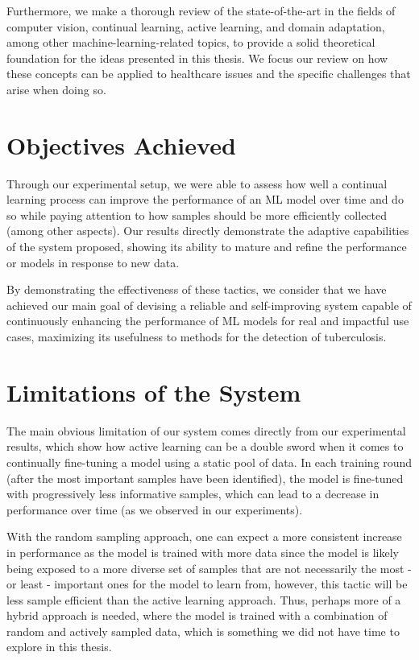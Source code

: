 \documentclass[../main.tex]{subfiles}
\begin{document}
    Furthermore, we make a thorough review of the state-of-the-art in the fields of computer vision, continual learning, active learning, and domain adaptation, among other machine-learning-related topics, to provide a solid theoretical foundation for the ideas presented in this thesis. We focus our review on how these concepts can be applied to healthcare issues and the specific challenges that arise when doing so.


    \section{Objectives Achieved
        } \label{conclusions:objectives_achieved} 

    Through our experimental setup, we were able to assess how well a continual learning process can improve the performance of an ML model over time and do so while paying attention to how samples should be more efficiently collected (among other aspects). Our results directly demonstrate the adaptive capabilities of the system proposed, showing its ability to mature and refine the performance or models in response to new data.

     By demonstrating the effectiveness of these tactics, we consider that we have achieved our main goal of devising a reliable and self-improving system capable of continuously enhancing the performance of ML models for real and impactful use cases, maximizing its usefulness to methods for the detection of tuberculosis.
     


    \section{Limitations of the System} \label{conclusions:limitations} 

    The main obvious limitation of our system comes directly from our experimental results, which show how active learning can be a double sword when it comes to continually fine-tuning a model using a static pool of data. In each training round (after the most important samples have been identified), the model is fine-tuned with progressively less informative samples, which can lead to a decrease in performance over time (as we observed in our experiments).

    With the random sampling approach, one can expect a more consistent increase in performance as the model is trained with more data since the model is likely being exposed to a more diverse set of samples that are not necessarily the most - or least - important ones for the model to learn from, however, this tactic will be less sample efficient than the active learning approach.
    \clearpage
    Thus, perhaps more of a hybrid approach is needed, where the model is trained with a combination of random and actively sampled data, which is something we did not have time to explore in this thesis.
\end{document}
